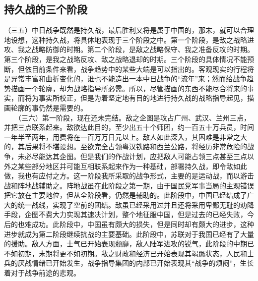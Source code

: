 \documentclass[cn,11pt,chinese]{elegantbook}
\def\myformat#1{\hfil\hfil #1}
\begin{document}
\subsection*{\myformat{持久战的三个阶段}}
（三五）中日战争既然是持久战，最后胜利又将是属于中国的，那末，就可以合理地设想，这种持久战，将具体地表现于三个阶段之中。第一个阶段，是敌之战略进攻、我之战略防御的时期。第二个阶段，是敌之战略保守、我之准备反攻的时期。第三个阶段，是我之战略反攻、敌之战略退却的时期。三个阶段的具体情况不能预断，但依目前条件来看，战争趋势中的某些大端是可以指出的。客观现实的行程将是异常丰富和曲折变化的，谁也不能造出一本中日战争的“流年”来；然而给战争趋势描画一个轮廓，却为战略指导所必需。所以，尽管描画的东西不能尽合将来的事实，而将为事实所校正，但是为着坚定地有目的地进行持久战的战略指导起见，描画轮廓的事仍然是需要的。\\
　　（三六）第一阶段，现在还未完结。敌之企图是攻占广州、武汉、兰州三点，并把三点联系起来。敌欲达此目的，至少出五十个师团，约一百五十万兵员，时间一年半至两年，用费将在一百万万日元以上。敌人如此深入，其困难是非常之大的，其后果将不堪设想。至欲完全占领粤汉铁路和西兰公路，将经历非常危险的战争，未必尽能达其企图。但是我们的作战计划，应把敌人可能占领三点甚至三点以外之某些部分地区并可能互相联系起来作为一种基础，部署持久战，即令敌如此做，我也有应付之方。这一阶段我所采取的战争形式，主要的是运动战，而以游击战和阵地战辅助之。阵地战虽在此阶段之第一期，由于国民党军事当局的主观错误把它放在主要地位，但从全阶段看，仍然是辅助的。此阶段中，中国已经结成了广大的统一战线，实现了空前的团结。敌虽已经采用过并且还将采用卑鄙无耻的劝降手段，企图不费大力实现其速决计划，整个地征服中国，但是过去的已经失败，今后的也难成功。此阶段中，中国虽有颇大的损失，但是同时却有颇大的进步，这种进步就成为第二阶段继续抗战的主要基础。此阶段中，苏联对于我国已经有了大量的援助。敌人方面，士气已开始表现颓靡，敌人陆军进攻的锐气，此阶段的中期已不如初期，末期将更不如初期。敌之财政和经济已开始表现其竭蹶状态，人民和士兵的厌战情绪已开始发生，战争指导集团的内部已开始表现其“战争的烦闷”，生长着对于战争前途的悲观。\\
\end{document}
